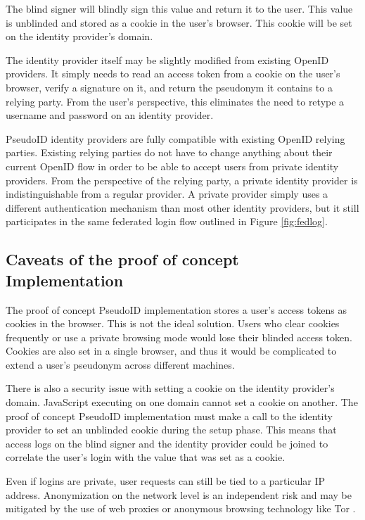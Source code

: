 \documentclass{llncs}
\begin{document}
The blind signer will blindly sign this value and return it to the
user. This value is unblinded and stored as a cookie in the user's
browser. This cookie will be set on the identity provider's domain.

The identity provider itself may be slightly modified from existing
OpenID providers. It simply needs to read an access token from a
cookie on the user's browser, verify a signature on it, and return the
pseudonym it contains to a relying party. From the user's perspective,
this eliminates the need to retype a username and password on an
identity provider.

PseudoID identity providers are fully compatible with existing OpenID
relying parties. Existing relying parties do not have to change
anything about their current OpenID flow in order to be able to accept
users from private identity providers. From the perspective of the
relying party, a private identity provider is indistinguishable from a
regular provider. A private provider simply uses a different
authentication mechanism than most other identity providers, but it
still participates in the same federated login flow outlined in Figure
\ref{fig:fedlog}.

\subsection{Caveats of the proof of concept Implementation}
\label{subsec:caveats}

The proof of concept PseudoID implementation stores a user's access
tokens as cookies in the browser. This is not the ideal solution. Users 
who clear cookies frequently or use a private browsing mode would
lose their blinded access token. Cookies are also set in a
single browser, and thus it would be complicated to extend a user's
pseudonym across different machines.

There is also a security issue with setting a cookie on the identity
provider's domain. JavaScript executing on one domain cannot set a
cookie on another. The proof of concept PseudoID implementation must
make a call to the identity provider to set an unblinded cookie during
the setup phase. This means that access logs on the blind signer and
the identity provider could be joined to correlate the user's login
with the value that was set as a cookie. 

Even if logins are private, user requests can still be tied to a
particular IP address. Anonymization on the network level is an
independent risk and may be mitigated by the use of web proxies or
anonymous browsing technology like Tor \cite{Tor}. 
\end{document}
